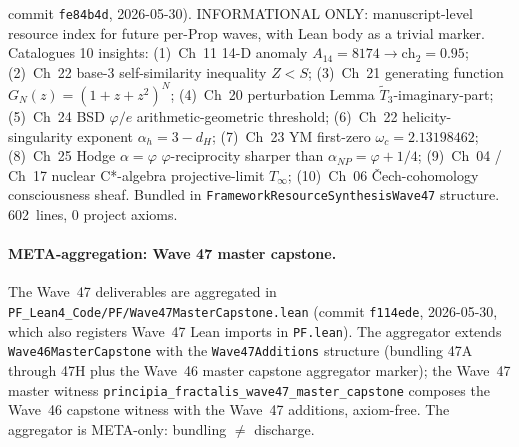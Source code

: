 \begin{itemize}
  commit \texttt{fe84b4d}, 2026-05-30). INFORMATIONAL ONLY:
  manuscript-level resource index for future per-Prop waves, with
  Lean body as a trivial marker. Catalogues 10 insights:
  (1)~Ch~11 14-D anomaly $A_{14} = 8174 \to \mathrm{ch}_2 = 0.95$;
  (2)~Ch~22 base-3 self-similarity inequality $Z < S$;
  (3)~Ch~21 generating function $G_N(z) = (1+z+z^2)^N$;
  (4)~Ch~20 perturbation Lemma $\widetilde{T}_3$-imaginary-part;
  (5)~Ch~24 BSD $\varphi/e$ arithmetic-geometric threshold;
  (6)~Ch~22 helicity-singularity exponent $\alpha_h = 3 - d_H$;
  (7)~Ch~23 YM first-zero $\omega_c = 2.13198462$;
  (8)~Ch~25 Hodge $\alpha = \varphi$ $\varphi$-reciprocity sharper
  than $\alpha_{NP} = \varphi + 1/4$;
  (9)~Ch~04 / Ch~17 nuclear C*-algebra projective-limit $T_\infty$;
  (10)~Ch~06 \v Cech-cohomology consciousness sheaf. Bundled in
  \texttt{FrameworkResourceSynthesisWave47} structure. 602~lines,
  0 project axioms.
\end{itemize}

\paragraph{META-aggregation: Wave 47 master capstone.} The Wave~47
deliverables are aggregated in
\texttt{PF\_Lean4\_Code/PF/Wave47MasterCapstone.lean} (commit
\texttt{f114ede}, 2026-05-30, which also registers Wave~47 Lean
imports in \texttt{PF.lean}). The aggregator extends
\texttt{Wave46MasterCapstone} with the \texttt{Wave47Additions}
structure (bundling 47A through 47H plus the Wave~46 master
capstone aggregator marker); the Wave~47 master witness
\texttt{principia\_fractalis\_wave47\_master\_capstone} composes
the Wave~46 capstone witness with the Wave~47 additions,
axiom-free. The aggregator is META-only: bundling $\neq$
discharge.

